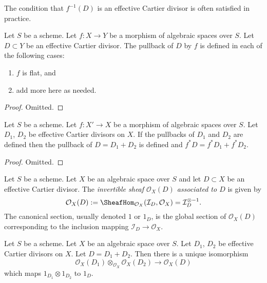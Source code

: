 \noindent
The condition that $f^{-1}(D)$ is an effective Cartier divisor
is often satisfied in practice.

\begin{lemma}
\label{lemma-pullback-effective-Cartier-defined}
Let $S$ be a scheme.
Let $f : X \to Y$ be a morphism of algebraic spaces over $S$.
Let $D \subset Y$ be an effective Cartier divisor.
The pullback of $D$ by $f$ is defined in each of the following cases:
\begin{enumerate}
\item $f$ is flat, and
\item add more here as needed.
\end{enumerate}
\end{lemma}

\begin{proof}
Omitted.
\end{proof}

\begin{lemma}
\label{lemma-pullback-effective-Cartier-divisors-additive}
Let $S$ be a scheme.
Let $f : X' \to X$ be a morphism of algebraic spaces over $S$.
Let $D_1$, $D_2$ be effective Cartier divisors on $X$.
If the pullbacks of $D_1$ and $D_2$ are defined then the
pullback of $D = D_1 + D_2$ is defined and
$f^*D = f^*D_1 + f^*D_2$.
\end{lemma}

\begin{proof}
Omitted.
\end{proof}

\begin{definition}
\label{definition-invertible-sheaf-effective-Cartier-divisor}
Let $S$ be a scheme. Let $X$ be an algebraic space over $S$
and let $D \subset X$ be an effective Cartier divisor.
The {\it invertible sheaf $\mathcal{O}_X(D)$ associated to $D$}
is given by
$$
\mathcal{O}_X(D) :=
\SheafHom_{\mathcal{O}_X}(\mathcal{I}_D, \mathcal{O}_X) =
\mathcal{I}_D^{\otimes -1}.
$$
The canonical section, usually denoted $1$ or $1_D$, is the
global section of $\mathcal{O}_X(D)$ corresponding to
the inclusion mapping $\mathcal{I}_D \to \mathcal{O}_X$.
\end{definition}

\begin{lemma}
\label{lemma-invertible-sheaf-sum-effective-Cartier-divisors}
Let $S$ be a scheme. Let $X$ be an algebraic space over $S$.
Let $D_1$, $D_2$ be effective Cartier divisors on $X$.
Let $D = D_1 + D_2$.
Then there is a unique isomorphism
$$
\mathcal{O}_X(D_1) \otimes_{\mathcal{O}_X} \mathcal{O}_X(D_2)
\longrightarrow
\mathcal{O}_X(D)
$$
which maps $1_{D_1} \otimes 1_{D_2}$ to $1_D$.
\end{lemma}

